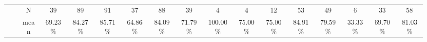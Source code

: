 \documentclass{sigchi}
\begin{document}
\begin{table}[t]
\begin{adjustbox}{width=1\textwidth}
\begin{tabular}{ccccccccccccccccc}
			\multicolumn{1}{|l|}{}                               & \multicolumn{1}{l|}{}                        & \multicolumn{1}{c|}{N}     & \multicolumn{1}{c|}{\cellcolor[HTML]{ACDDAA}39}           & \multicolumn{1}{c|}{\cellcolor[HTML]{ACDDAA}89}          & \multicolumn{1}{c|}{\cellcolor[HTML]{ACDDAA}91}           & \multicolumn{1}{c|}{\cellcolor[HTML]{ACDDAA}37}          & \multicolumn{1}{c|}{\cellcolor[HTML]{FFFFC7}88}                & \multicolumn{1}{c|}{\cellcolor[HTML]{FFFFC7}39}             & \multicolumn{1}{c|}{\cellcolor[HTML]{FFFFC7}4}        & \multicolumn{1}{c|}{\cellcolor[HTML]{FFFFC7}4}       & \multicolumn{1}{c|}{\cellcolor[HTML]{FFFFC7}12}      & \multicolumn{1}{c|}{\cellcolor[HTML]{FFFFC7}53}      & \multicolumn{1}{c|}{\cellcolor[HTML]{FFFFC7}49}      & \multicolumn{1}{c|}{\cellcolor[HTML]{FFFFC7}6}       & \multicolumn{1}{c|}{33}                                   & \multicolumn{1}{c|}{58}                                  \\ \cline{3-17} 
			\multicolumn{1}{|l|}{}                               & \multicolumn{1}{l|}{}                        & \multicolumn{1}{c|}{mean}  & \multicolumn{1}{c|}{\cellcolor[HTML]{ACDDAA}69.23\%}      & \multicolumn{1}{c|}{\cellcolor[HTML]{ACDDAA}84.27\%}     & \multicolumn{1}{c|}{\cellcolor[HTML]{ACDDAA}85.71\%}      & \multicolumn{1}{c|}{\cellcolor[HTML]{ACDDAA}64.86\%}     & \multicolumn{1}{c|}{\cellcolor[HTML]{FFFFC7}84.09\%}           & \multicolumn{1}{c|}{\cellcolor[HTML]{FFFFC7}71.79\%}        & \multicolumn{1}{c|}{\cellcolor[HTML]{FFFFC7}100.00\%} & \multicolumn{1}{c|}{\cellcolor[HTML]{FFFFC7}75.00\%} & \multicolumn{1}{c|}{\cellcolor[HTML]{FFFFC7}75.00\%} & \multicolumn{1}{c|}{\cellcolor[HTML]{FFFFC7}84.91\%} & \multicolumn{1}{c|}{\cellcolor[HTML]{FFFFC7}79.59\%} & \multicolumn{1}{c|}{\cellcolor[HTML]{FFFFC7}33.33\%} & \multicolumn{1}{c|}{69.70\%}                              & \multicolumn{1}{c|}{81.03\%}                             \\ \cline{3-17} 

\end{tabular}
\end{adjustbox}
\end{table}
\end{document}
